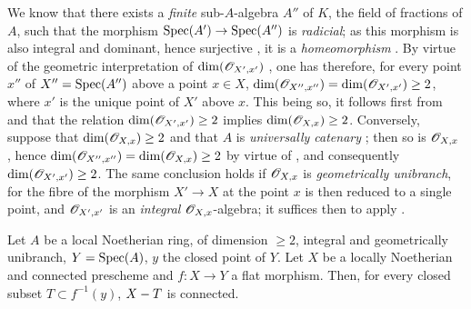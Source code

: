 \begin{remark}[18.9.7.6]
\label{IV.18.9.7.6}
We know  that there exists a \emph{finite} sub-$A$-algebra $A''$ of $K$, the field of fractions of $A$, such that the morphism $\operatorname{Spec}(A')\to\operatorname{Spec}(A'')$ is \emph{radicial};
as this morphism is also integral and dominant, hence surjective , it is a \emph{homeomorphism} .
By virtue of the geometric interpretation of $\dim(\mathscr{O}_{X',x'})$ , one has therefore, for every point $x''$ of $X''=\operatorname{Spec}(A'')$ above a point $x\in X$, $\dim(\mathscr{O}_{X'',x''})=\dim(\mathscr{O}_{X',x'})\geq 2$, where $x'$ is the unique point of $X'$ above $x$.
This being so, it follows first from  and  that the relation $\dim(\mathscr{O}_{X',x'})\geq 2$ implies $\dim(\mathscr{O}_{X,x})\geq 2$.
Conversely, suppose that $\dim(\mathscr{O}_{X,x})\geq 2$ and that $A$ is \emph{universally catenary} ; then so is $\mathscr{O}_{X,x}$ , hence $\dim(\mathscr{O}_{X'',x''})=\dim(\mathscr{O}_{X,x})\geq 2$ by virtue of , and consequently $\dim(\mathscr{O}_{X',x'})\geq 2$.
The same conclusion holds if $\mathscr{O}_{X,x}$ is \emph{geometrically unibranch}, for the fibre of the morphism $X'\to X$ at the point $x$ is then reduced to a single point, and $\mathscr{O}_{X',x'}$ is an \emph{integral} $\mathscr{O}_{X,x}$-algebra;
it suffices then to apply .
\end{remark}

\begin{lemma}[18.9.7.7]
\label{IV.18.9.7.7}
Let $A$ be a local Noetherian ring, of dimension $\geq 2$, integral and geometrically unibranch, $Y=\operatorname{Spec}(A)$, $y$ the closed point of $Y$.
Let $X$ be a locally Noetherian and connected prescheme and $f:X\to Y$ a flat morphism.
Then, for every closed subset $T\subset f^{-1}(y)$, $X- T$ is connected.
\end{lemma}

